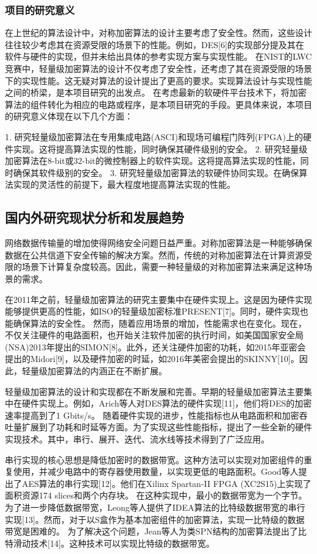 \documentclass{ctexart}
\begin{document}
\subsubsection{项目的研究意义}
在上世纪的算法设计中，对称加密算法的设计主要考虑了安全性。然而，这些设计往往较少考虑其在资源受限的场景下的性能。例如，DES[6]的实现部分提及其在软件与硬件的实现，但并未给出具体的参考实现方案与实现性能。
在NIST的LWC竞赛中，轻量级加密算法的设计不仅考虑了安全性，还考虑了其在资源受限的场景下的实现性能。这无疑对算法的设计提出了更高的要求。实现算法设计与实现性能之间的桥梁，是本项目研究的出发点。
在考虑最新的软硬件平台技术下，将加密算法的组件转化为相应的电路或程序，是本项目研究的手段。更具体来说，本项目的研究意义体现在以下几个方面：

1. 研究轻量级加密算法在专用集成电路(ASCI)和现场可编程门阵列(FPGA)上的硬件实现。这将提高算法实现的性能，同时确保其硬件级别的安全。
2. 研究轻量级加密算法在8-bit或32-bit的微控制器上的软件实现。这将提高算法实现的性能，同时确保其软件级别的安全。
3. 研究轻量级加密算法的软硬件协同实现。在确保算法实现的灵活性的前提下，最大程度地提高算法实现的性能。


\subsection{国内外研究现状分析和发展趋势}

网络数据传输量的增加使得网络安全问题日益严重。对称加密算法是一种能够确保数据在公共信道下安全传输的解决方案。然而，传统的对称加密算法在计算资源受限的场景下计算复杂度较高。因此，需要一种轻量级的对称加密算法来满足这种场景的需求。

在2011年之前，轻量级加密算法的研究主要集中在硬件实现上。这是因为硬件实现能够提供更高的性能，如ISO的轻量级加密标准PRESENT[7]。同时，硬件实现也能确保算法的安全性。
然而，随着应用场景的增加，性能需求也在变化。现在，不仅关注硬件的电路面积，也开始关注软件加密的执行时间，如美国国家安全局(NSA)2013年提出的SIMON[8]。此外，还关注硬件加密的功耗，如2015年亚密会提出的Midori[9]，以及硬件加密的时延，如2016年美密会提出的SKINNY[10]。因此，轻量级加密算法的内涵正在不断扩展。

轻量级加密算法的设计和实现都在不断发展和完善。早期的轻量级加密算法主要集中在硬件实现上。例如，Arich等人对DES算法的硬件实现[11]，他们将DES的加密速率提高到了1 Gbits/s。
随着硬件实现的进步，性能指标也从电路面积和加密吞吐量扩展到了功耗和时延等方面。为了实现这些性能指标，提出了一些全新的硬件实现技术。其中，串行、展开、迭代、流水线等技术得到了广泛应用。

串行实现的核心思想是降低加密时的数据带宽。这种方法可以实现对加密组件的重复使用，并减少电路中的寄存器使用数量，以实现更低的电路面积。Good等人提出了AES算法的串行实现[12]。他们在Xilinx Spartan-II FPGA (XC2S15)上实现了面积资源174 slices和两个内存块。
在这种实现中，最小的数据带宽为一个字节。为了进一步降低数据带宽，Leong等人提供了IDEA算法的比特级数据带宽的串行实现[13]。然而，对于以S盒作为基本加密组件的加密算法，实现一比特级的数据带宽是困难的。
为了解决这个问题，Jean等人为类SPN结构的加密算法提出了比特滑动技术[14]。这种技术可以实现比特级的数据带宽。
\end{document}
